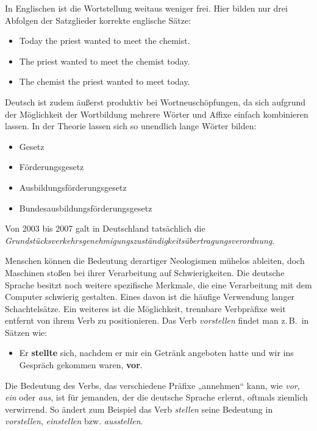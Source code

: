 \begin{multicols}{2}
In Englischen ist die Wortstellung weitaus weniger frei. Hier bilden nur drei Abfolgen der Satzglieder korrekte englische Sätze:

\begin{itemize}
\item Today the priest wanted to meet the chemist.
\item The priest wanted to meet the chemist today.
\item The chemist the priest wanted to meet today.
\end{itemize} 


Deutsch ist zudem äußerst produktiv bei Wortneuschöpfungen, da sich aufgrund der Möglichkeit der Wortbildung mehrere Wörter und Affixe einfach kombinieren lassen. In der Theorie lassen sich so unendlich lange Wörter bilden:

\begin{itemize} 
\item Gesetz 
\item Förderungsgesetz 
\item Ausbildungsförderungsgesetz 
\item Bundesausbildungsförderungsgesetz 
\end{itemize}

Von 2003 bis 2007 galt in Deutschland tatsächlich die 
\textit{Grund\-stücks\-ver\-kehrs\-ge\-neh\-mi\-gungs\-zu\-stän\-dig\-keits\-über\-tra\-gungs\-ver\-ordnung}. 

Menschen können die Bedeutung derartiger Neologismen mühelos ableiten, doch Maschinen stoßen bei ihrer Verarbeitung auf Schwierigkeiten. Die deutsche Sprache besitzt noch weitere spezifische Merkmale, die eine Verarbeitung mit dem Computer schwierig gestalten. Eines davon ist die häufige Verwendung langer Schachtelsätze. Ein weiteres ist die Möglichkeit, trennbare Verbpräfixe weit entfernt von ihrem Verb zu positionieren. Das Verb \textit{vorstellen} findet man z.\,B.~in Sätzen wie:

\begin{itemize}    
\item Er \textbf{stellte} sich, nachdem er mir ein Getränk angeboten hatte und wir ins Gespräch gekommen waren, \textbf{vor}. 
\end{itemize}
 
Die Bedeutung des Verbs, das verschiedene Präfixe „annehmen“ kann, wie \textit{vor}, \textit{ein} oder \textit{aus}, ist für jemanden, der die deutsche Sprache erlernt, oftmals ziemlich verwirrend. So ändert zum Beispiel das Verb \textit{stellen} seine Bedeutung in \textit{vorstellen}, \textit{einstellen} bzw. \textit{ausstellen}.


\end{multicols}

